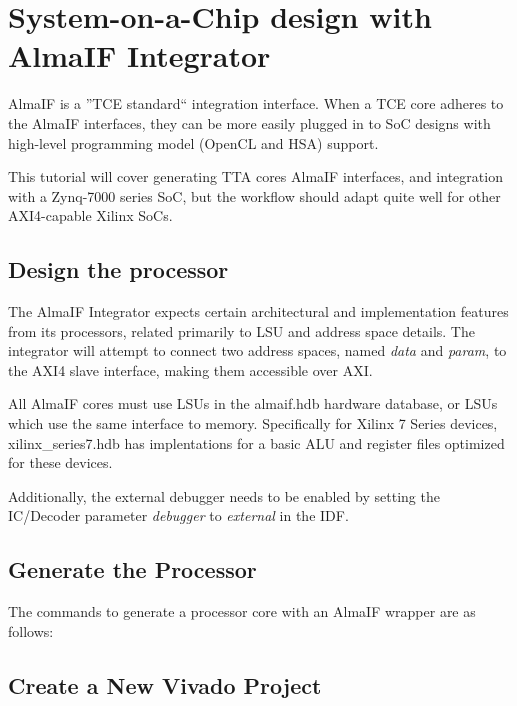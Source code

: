\documentclass[twoside]{tceusermanual}
\begin{document}
\section{System-on-a-Chip design with AlmaIF Integrator}

AlmaIF is a ''TCE standard`` integration interface. When a TCE core adheres
to the AlmaIF interfaces, they can be more easily plugged in to SoC designs with
high-level programming model (OpenCL and HSA) support.

This tutorial will cover generating TTA cores AlmaIF interfaces, and
integration with a Zynq-7000
series SoC, but the workflow should adapt quite well for other AXI4-capable
Xilinx SoCs.

\subsection{Design the processor}

The AlmaIF Integrator expects certain architectural and implementation features
from its processors, related primarily to LSU and address space details.
The integrator will attempt to connect two address spaces, named \textit{data}
and \textit{param}, to the AXI4 slave interface, making them accessible over
AXI.

All AlmaIF cores must use LSUs in the almaif.hdb hardware database, or LSUs
which use the same interface to memory. Specifically for Xilinx 7 Series
devices, xilinx\_series7.hdb has implentations for a basic ALU and register files
optimized for these devices.

Additionally, the external debugger needs to be enabled by setting the
IC/Decoder parameter \textit{debugger} to \textit{external} in the IDF.

\subsection{Generate the Processor}

The commands to generate a processor core with an AlmaIF wrapper are as follows:



\subsection{Create a New Vivado Project}
\end{document}
